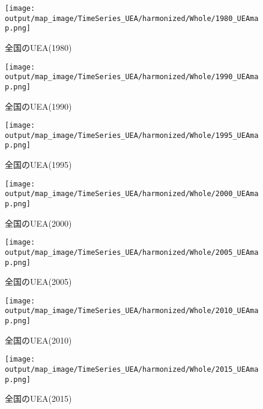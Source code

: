\documentclass{ltjsarticle}
\begin{document}
\begin{figure}[pbth]
  \centering
  \texttt{[image: output/map\_image/TimeSeries\_UEA/harmonized/Whole/1980\_UEAmap.png]}
  \caption{\label{ham:1980UEA:who}全国のUEA(1980)}
\end{figure}
\begin{figure}[pbth]
  \centering
  \texttt{[image: output/map\_image/TimeSeries\_UEA/harmonized/Whole/1990\_UEAmap.png]}
  \caption{\label{ham:1990UEA:who}全国のUEA(1990)}
\end{figure}
\begin{figure}[pbth]
  \centering
  \texttt{[image: output/map\_image/TimeSeries\_UEA/harmonized/Whole/1995\_UEAmap.png]}
  \caption{\label{ham:1995UEA:who}全国のUEA(1995)}
\end{figure}
\begin{figure}[pbth]
  \centering
  \texttt{[image: output/map\_image/TimeSeries\_UEA/harmonized/Whole/2000\_UEAmap.png]}
  \caption{\label{ham:2000UEA:who}全国のUEA(2000)}
\end{figure}
\begin{figure}[pbth]
  \centering
  \texttt{[image: output/map\_image/TimeSeries\_UEA/harmonized/Whole/2005\_UEAmap.png]}
  \caption{\label{ham:2005UEA:who}全国のUEA(2005)}
\end{figure}
\begin{figure}[pbth]
  \centering
  \texttt{[image: output/map\_image/TimeSeries\_UEA/harmonized/Whole/2010\_UEAmap.png]}
  \caption{\label{ham:2010UEA:who}全国のUEA(2010)}
\end{figure}
\begin{figure}[pbth]
  \centering
  \texttt{[image: output/map\_image/TimeSeries\_UEA/harmonized/Whole/2015\_UEAmap.png]}
  \caption{\label{ham:2015UEA:who}全国のUEA(2015)}
\end{figure}
\end{document}
